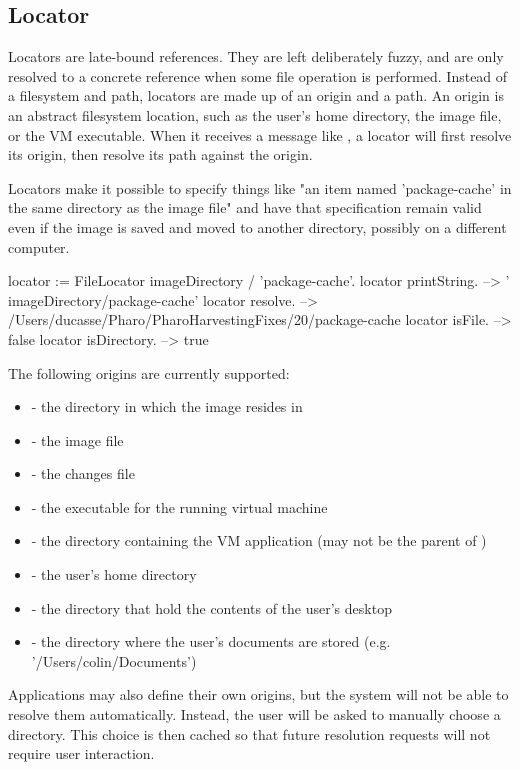 \documentclass[a4paper,10pt,twoside]{book}
\begin{document}
\subsection{Locator} Locators are late-bound references. They are left deliberately fuzzy, and are only resolved to a concrete reference when some file operation is performed. Instead of a filesystem and path, locators are made up of an origin and a path. An origin is an abstract filesystem location, such as the user's home directory, the image file, or the VM executable. When it receives a message like , a locator will first resolve its origin, then resolve its path against the origin.

Locators make it possible to specify things like "an item named 'package-cache' in the same directory as the image file" and have that specification remain valid even if the image is saved and moved to another directory, possibly on a different computer.

\begin{code}{}
    locator := FileLocator imageDirectory / 'package-cache'.
    locator printString.             --> ' {imageDirectory}/package-cache'
    locator resolve.                  -->  /Users/ducasse/Pharo/PharoHarvestingFixes/20/package-cache
    locator isFile.              	    --> false
    locator isDirectory.            --> true
\end{code}	

The following origins are currently supported:

\begin{itemize}
\item {} - the directory in which the image resides in
\item{} - the image file
\item{} - the changes file
\item{} - the executable for the running virtual machine
\item{} - the directory containing the VM application (may not be the parent of )
\item{} - the user's home directory
\item{} - the directory that hold the contents of the user's desktop
\item{} - the directory where the user's documents are stored (e.g. '/Users/colin/Documents')
\end{itemize}

Applications may also define their own origins, but the system will not be able to resolve them automatically. Instead, the user will be asked to manually choose a directory. This choice is then cached so that future resolution requests will not require user interaction.
\end{document}
